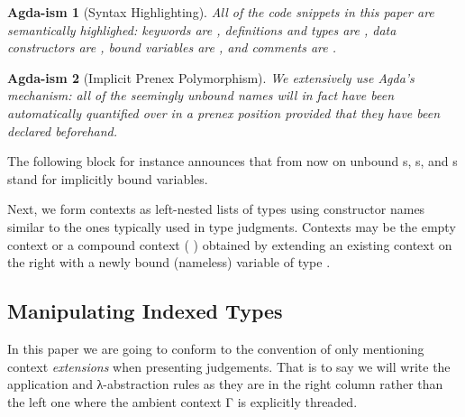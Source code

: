 \documentclass{article}
\newtheorem*{remark}{Agda-ism}
\begin{document}

\begin{remark}[Syntax Highlighting]
  All of the code snippets in this paper are semantically highlighed:
  keywords are , definitions and types are ,
  data constructors are , bound variables are
  , and comments are .
\end{remark}

\begin{remark}[Implicit Prenex Polymorphism]
  We extensively use Agda's  mechanism: all of
  the seemingly unbound names will in fact have been automatically
  quantified over in a prenex position provided that they
  have been declared beforehand.
\end{remark}

The following block for instance announces that from now
on unbound s, s, and s stand for implicitly bound
 variables.


Next, we form contexts as left-nested lists of types using
constructor names similar to the ones typically used in
type judgments.
Contexts may be the empty context 
or a compound context ( \AIC{,} ) obtained
by extending an existing context  on the right
with a newly bound (nameless) variable of type .


\subsection{Manipulating Indexed Types}

In this paper we are going to conform to the convention
of only mentioning context \emph{extensions} when
presenting judgements.
%
That is to say we will write the application and
λ-abstraction rules as they are in the right column
rather than the left one where the ambient context Γ
is explicitly threaded.

\noindent
\begin{minipage}{.4\textwidth}
\end{minipage}\hfill
\begin{minipage}{.4\textwidth}
\end{minipage}
\end{document}
